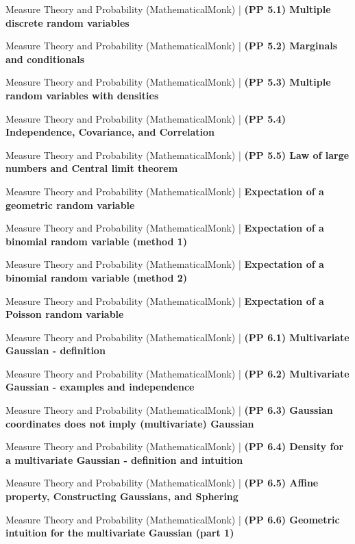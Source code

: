 \documentclass[a4, landscape, 12pt]{article}
\newcommand{\checkbox}{$\square$}%
\begin{document}
\begin{itemize}
{{}
\item [\checkbox] Measure Theory and Probability (MathematicalMonk)  | \textbf{(PP 5.1) Multiple discrete random variables
}
\item [\checkbox] Measure Theory and Probability (MathematicalMonk)  | \textbf{(PP 5.2) Marginals and conditionals
}
\item [\checkbox] Measure Theory and Probability (MathematicalMonk)  | \textbf{(PP 5.3) Multiple random variables with densities
}
\item [\checkbox] Measure Theory and Probability (MathematicalMonk)  | \textbf{(PP 5.4) Independence, Covariance, and Correlation
}
\item [\checkbox] Measure Theory and Probability (MathematicalMonk)  | \textbf{(PP 5.5) Law of large numbers and Central limit theorem
}
\item [\checkbox] Measure Theory and Probability (MathematicalMonk)  | \textbf{Expectation of a geometric random variable
}
\item [\checkbox] Measure Theory and Probability (MathematicalMonk)  | \textbf{Expectation of a binomial random variable (method 1)
}
\item [\checkbox] Measure Theory and Probability (MathematicalMonk)  | \textbf{Expectation of a binomial random variable (method 2)
}
\item [\checkbox] Measure Theory and Probability (MathematicalMonk)  | \textbf{Expectation of a Poisson random variable
}
\item [\checkbox] Measure Theory and Probability (MathematicalMonk)  | \textbf{(PP 6.1) Multivariate Gaussian - definition
}
\item [\checkbox] Measure Theory and Probability (MathematicalMonk)  | \textbf{(PP 6.2) Multivariate Gaussian - examples and independence
}
\item [\checkbox] Measure Theory and Probability (MathematicalMonk)  | \textbf{(PP 6.3) Gaussian coordinates does not imply (multivariate) Gaussian
}
\item [\checkbox] Measure Theory and Probability (MathematicalMonk)  | \textbf{(PP 6.4) Density for a multivariate Gaussian - definition and intuition
}
\item [\checkbox] Measure Theory and Probability (MathematicalMonk)  | \textbf{(PP 6.5) Affine property, Constructing Gaussians, and Sphering
}
\item [\checkbox] Measure Theory and Probability (MathematicalMonk)  | \textbf{(PP 6.6) Geometric intuition for the multivariate Gaussian (part 1)
}}
\end{itemize}
\end{document}

